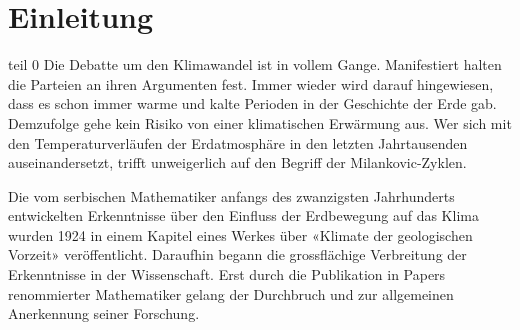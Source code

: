 %
%
%
%
\section{Einleitung\label{milankovic:section:teil0}}

teil 0
Die Debatte um den Klimawandel ist in vollem Gange.
Manifestiert halten die Parteien an ihren Argumenten fest.
Immer wieder wird darauf hingewiesen, dass es schon immer warme und kalte Perioden in der Geschichte der Erde gab.
Demzufolge gehe kein Risiko von einer klimatischen Erwärmung aus.
Wer sich mit den Temperaturverläufen der Erdatmosphäre in den letzten Jahrtausenden auseinandersetzt, trifft unweigerlich auf den Begriff der Milankovic-Zyklen.

Die vom serbischen Mathematiker anfangs des zwanzigsten Jahrhunderts entwickelten Erkenntnisse über den Einfluss der Erdbewegung auf das Klima wurden 1924 in einem Kapitel eines Werkes über «Klimate der geologischen Vorzeit» veröffentlicht.
Daraufhin begann die grossflächige Verbreitung der Erkenntnisse in der Wissenschaft. Erst durch die Publikation in Papers renommierter Mathematiker gelang der Durchbruch und zur allgemeinen Anerkennung seiner Forschung.


